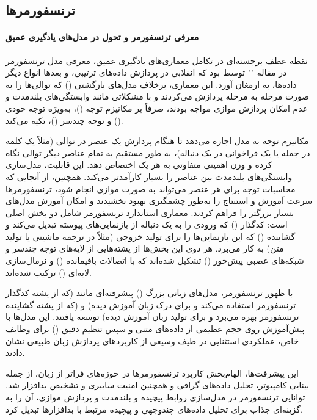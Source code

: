 \subsection{ترنسفورمرها}

\paragraph{معرفی ترنسفورمر و تحول در مدل‌های یادگیری عمیق}
نقطه عطف برجسته‌ای در تکامل معماری‌های یادگیری عمیق، معرفی مدل ترنسفورمر در مقاله "" توسط \textcite{attention} بود که انقلابی در پردازش داده‌های ترتیبی، و بعدها انواع دیگر داده‌ها، به ارمغان آورد. این معماری، برخلاف مدل‌های بازگشتی () که توالی‌ها را به صورت مرحله به مرحله پردازش می‌کردند و با مشکلاتی مانند وابستگی‌های بلندمدت و عدم امکان پردازش موازی مواجه بودند، صرفاً بر مکانیزم توجه ()، به‌ویژه توجه خودی () و توجه چندسر ()، تکیه می‌کند.

مکانیزم توجه به مدل اجازه می‌دهد تا هنگام پردازش یک عنصر در توالی (مثلاً یک کلمه در جمله یا یک فراخوانی  در یک دنباله)، به طور مستقیم به تمام عناصر دیگر توالی نگاه کرده و وزن اهمیتی متفاوتی به هر یک اختصاص دهد. این قابلیت، مدل‌سازی وابستگی‌های بلندمدت بین عناصر را بسیار کارآمدتر می‌کند. همچنین، از آنجایی که محاسبات توجه برای هر عنصر می‌تواند به صورت موازی انجام شود، ترنسفورمرها سرعت آموزش و استنتاج را به‌طور چشمگیری بهبود بخشیدند و امکان آموزش مدل‌های بسیار بزرگتر را فراهم کردند. معماری استاندارد ترنسفورمر شامل دو بخش اصلی است: کدگذار () که ورودی را به یک دنباله از بازنمایی‌های پیوسته تبدیل می‌کند و گشاینده () که این بازنمایی‌ها را برای تولید خروجی (مثلاً در ترجمه ماشینی یا تولید متن) به کار می‌برد. هر دوی این بخش‌ها از پشته‌هایی از لایه‌های توجه چندسر و شبکه‌های عصبی پیش‌خور () تشکیل شده‌اند که با اتصالات باقیمانده () و نرمال‌سازی لایه‌ای () ترکیب شده‌اند.

با ظهور ترنسفورمر، مدل‌های زبانی بزرگ () پیشرفته‌ای مانند   (که از پشته کدگذار ترنسفورمر استفاده می‌کند و برای درک زبان آموزش دیده) و  (که از پشته گشاینده ترنسفورمر بهره می‌برد و برای تولید زبان آموزش دیده) توسعه یافتند. این مدل‌ها با پیش‌آموزش روی حجم عظیمی از داده‌های متنی و سپس تنظیم دقیق () برای وظایف خاص، عملکردی استثنایی در طیف وسیعی از کاربردهای پردازش زبان طبیعی نشان دادند.

این پیشرفت‌ها، الهام‌بخش کاربرد ترنسفورمرها در حوزه‌های فراتر از زبان، از جمله بینایی کامپیوتر، تحلیل داده‌های گرافی و همچنین امنیت سایبری و تشخیص بدافزار \cite{TransformerMalware} شد. توانایی ترنسفورمر در مدل‌سازی روابط پیچیده و بلندمدت و پردازش موازی، آن را به گزینه‌ای جذاب برای تحلیل داده‌های چندوجهی و پیچیده مرتبط با بدافزارها تبدیل کرد.

